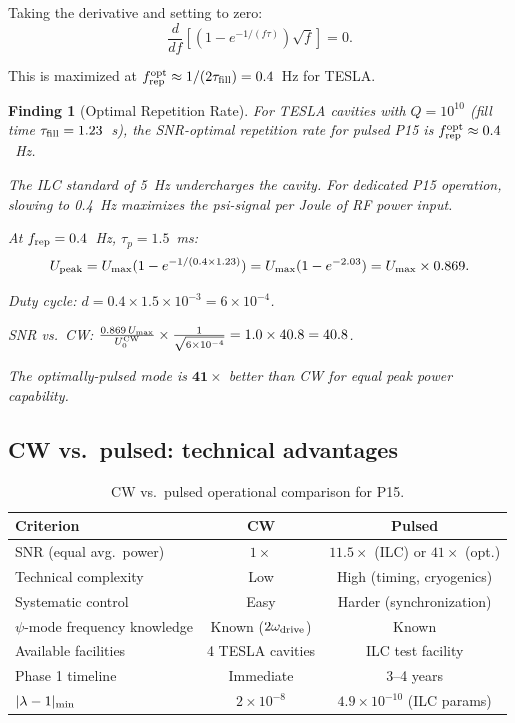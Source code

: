\documentclass[11pt]{article}
\newtheorem{finding}{Finding}
\newcommand{\ee}[1]{\times 10^{#1}}
\newcommand{\lam}{\lambda}
\begin{document}
Taking the derivative and setting to zero:
\begin{equation}
\frac{d}{df}\left[(1 - e^{-1/(f\tau)})\sqrt{f}\right] = 0.
\end{equation}

This is maximized at $f_{\rm rep}^{\rm opt} \approx 1/(2\tau_{\rm fill})
= 0.4$~Hz for TESLA.

\begin{finding}[Optimal Repetition Rate]
\label{find:pulse-rate}
For TESLA cavities with $Q = 10^{10}$ (fill time $\tau_{\rm fill} = 1.23$~s),
the SNR-optimal repetition rate for pulsed P15 is $f_{\rm rep}^{\rm opt}
\approx 0.4$~Hz.

The ILC standard of 5~Hz undercharges the cavity. For dedicated P15 operation,
slowing to 0.4~Hz maximizes the psi-signal per Joule of RF power input.

At $f_{\rm rep} = 0.4$~Hz, $\tau_p = 1.5$~ms:
\begin{equation}
U_{\rm peak} = U_{\rm max}(1 - e^{-1/(0.4\times1.23)}) = U_{\rm max}(1 - e^{-2.03})
= U_{\rm max} \times 0.869.
\end{equation}

Duty cycle: $d = 0.4 \times 1.5\ee{-3} = 6\ee{-4}$.

SNR vs.\ CW: $\frac{0.869\,U_{\rm max}}{U_0^{\rm CW}} \times \frac{1}{\sqrt{6\ee{-4}}}
= 1.0 \times 40.8 = 40.8$.

The optimally-pulsed mode is $\mathbf{41\times}$ better than CW for equal
peak power capability.
\end{finding}

\subsection{CW vs.\ pulsed: technical advantages}

\begin{table}[H]
\centering
\caption{CW vs.\ pulsed operational comparison for P15.}
\begin{tabular}{lcc}
\toprule
Criterion & CW & Pulsed \\
\midrule
SNR (equal avg.\ power) & $1\times$ & $11.5\times$ (ILC) or $41\times$ (opt.) \\
Technical complexity & Low & High (timing, cryogenics) \\
Systematic control & Easy & Harder (synchronization) \\
$\psi$-mode frequency knowledge & Known ($2\omega_{\rm drive}$) & Known \\
Available facilities & 4 TESLA cavities & ILC test facility \\
Phase 1 timeline & Immediate & 3--4 years \\
\midrule
$|\lam-1|_{\rm min}$ & $2\ee{-8}$ & $4.9\ee{-10}$ (ILC params) \\
\bottomrule
\end{tabular}
\end{table}
\end{document}
